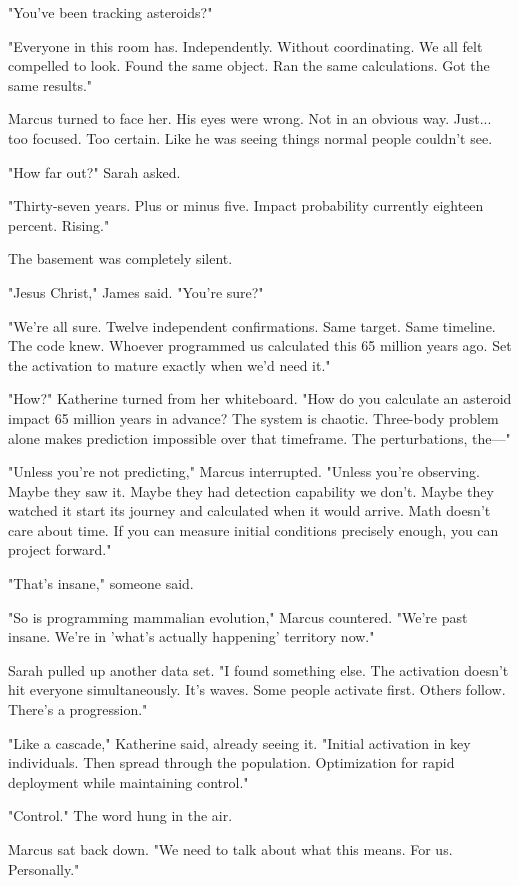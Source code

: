 "You've been tracking asteroids?"

"Everyone in this room has. Independently. Without coordinating. We all felt compelled to look. Found the same object. Ran the same calculations. Got the same results."

Marcus turned to face her. His eyes were wrong. Not in an obvious way. Just... too focused. Too certain. Like he was seeing things normal people couldn't see.

"How far out?" Sarah asked.

"Thirty-seven years. Plus or minus five. Impact probability currently eighteen percent. Rising."

The basement was completely silent.

"Jesus Christ," James said. "You're sure?"

"We're all sure. Twelve independent confirmations. Same target. Same timeline. The code knew. Whoever programmed us calculated this 65 million years ago. Set the activation to mature exactly when we'd need it."

"How?" Katherine turned from her whiteboard. "How do you calculate an asteroid impact 65 million years in advance? The system is chaotic. Three-body problem alone makes prediction impossible over that timeframe. The perturbations, the—"

"Unless you're not predicting," Marcus interrupted. "Unless you're observing. Maybe they saw it. Maybe they had detection capability we don't. Maybe they watched it start its journey and calculated when it would arrive. Math doesn't care about time. If you can measure initial conditions precisely enough, you can project forward."

"That's insane," someone said.

"So is programming mammalian evolution," Marcus countered. "We're past insane. We're in 'what's actually happening' territory now."

Sarah pulled up another data set. "I found something else. The activation doesn't hit everyone simultaneously. It's waves. Some people activate first. Others follow. There's a progression."

"Like a cascade," Katherine said, already seeing it. "Initial activation in key individuals. Then spread through the population. Optimization for rapid deployment while maintaining control."

"Control." The word hung in the air.

Marcus sat back down. "We need to talk about what this means. For us. Personally."

